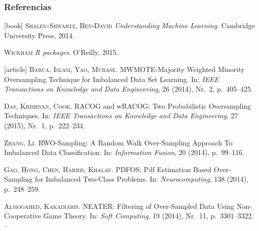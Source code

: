 \begin{frame}[allowframebreaks]\frametitle{Referencias}
 \vspace{3em}
 \begin{thebibliography}{99}
  [book]
     \textsc{Shalev-Shwartz, Ben-David}
     \newblock \emph{Understanding Machine Learning}.
     \newblock Cambridge University Press, 2014.
     
     \textsc{Wickham}
     \newblock \emph{R packages}.
     \newblock O'Reilly, 2015.   
   
   [article]
     \textsc{Barua, Islam, Yao, Murase}.
     \newblock MWMOTE-Majority Weighted Minority Oversampling Technique for
       Imbalanced Data Set Learning.
     \newblock In: \emph{IEEE Transactions on Knowledge and Data Engineering}, 26 (2014), Nr.~2, p.~405--425.

     \textsc{Das, Krishnan, Cook}.
     \newblock RACOG and wRACOG: Two Probabilistic Oversampling Techniques.
     \newblock In: \emph{IEEE Transactions on Knowledge and Data Engineering}, 27 (2015), Nr.~1, p.~222--234.
   
     \textsc{Zhang, Li}.
     \newblock RWO-Sampling: A Random Walk Over-Sampling Approach To Imbalanced Data Classification.
     \newblock In: \emph{Information Fusion}, 20 (2014), p.~99--116.
     
     \textsc{Gao, Hong, Chen, Harris, Khalaf}.
     \newblock PDFOS: Pdf Estimation Based Over-Sampling for Imbalanced Two-Class Problems.
     \newblock In: \emph{Neurocomputing}, 138 (2014), p.~248--259.
     
     \textsc{Almogahed, Kakadiaris}.
     \newblock NEATER: Filtering of Over-Sampled Data Using Non-Cooperative Game Theory.
     \newblock In: \emph{Soft Computing}, 19 (2014), Nr.~11, p.~3301--3322. --

 \end{thebibliography}
\end{frame}